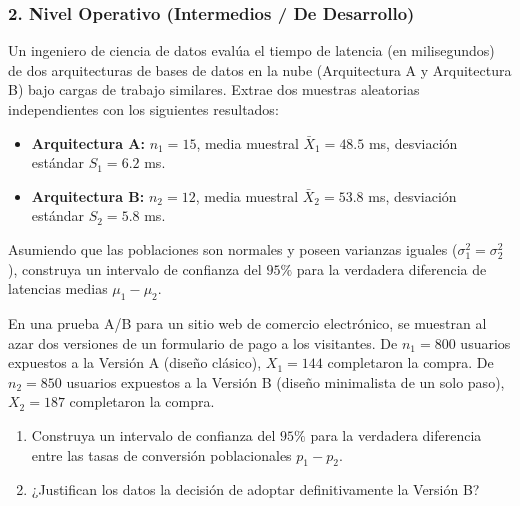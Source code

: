 \subsubsection*{2. Nivel Operativo (Intermedios / De Desarrollo)}

\begin{problema}
	\label{prob:dif_medias_indep_iguales}
	Un ingeniero de ciencia de datos evalúa el tiempo de latencia (en milisegundos) de dos arquitecturas de bases de datos en la nube (Arquitectura A y Arquitectura B) bajo cargas de trabajo similares. Extrae dos muestras aleatorias independientes con los siguientes resultados:
	\begin{itemize}
		\item \textbf{Arquitectura A:} $n_1 = 15$, media muestral $\bar{X}_1 = 48.5$ ms, desviación estándar $S_1 = 6.2$ ms.
		\item \textbf{Arquitectura B:} $n_2 = 12$, media muestral $\bar{X}_2 = 53.8$ ms, desviación estándar $S_2 = 5.8$ ms.
	\end{itemize}
	Asumiendo que las poblaciones son normales y poseen varianzas iguales ($\sigma_1^2 = \sigma_2^2$), construya un intervalo de confianza del $95\%$ para la verdadera diferencia de latencias medias $\mu_1 - \mu_2$.
\end{problema}

\begin{problema}
	\label{prob:dif_proporciones_ab}
	En una prueba A/B para un sitio web de comercio electrónico, se muestran al azar dos versiones de un formulario de pago a los visitantes. De $n_1 = 800$ usuarios expuestos a la Versión A (diseño clásico), $X_1 = 144$ completaron la compra. De $n_2 = 850$ usuarios expuestos a la Versión B (diseño minimalista de un solo paso), $X_2 = 187$ completaron la compra.
	\begin{enumerate}
		\item Construya un intervalo de confianza del $95\%$ para la verdadera diferencia entre las tasas de conversión poblacionales $p_1 - p_2$.
		\item ¿Justifican los datos la decisión de adoptar definitivamente la Versión B?
	\end{enumerate}
\end{problema}

